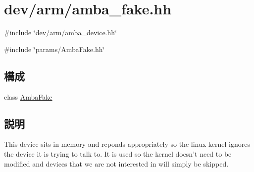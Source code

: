 \hypertarget{amba__fake_8hh}{
\section{dev/arm/amba\_\-fake.hh}
\label{amba__fake_8hh}
}
{\ttfamily \#include \char`\"{}dev/arm/amba\_\-device.hh\char`\"{}}\par
{\ttfamily \#include \char`\"{}params/AmbaFake.hh\char`\"{}}\par
\subsection*{構成}
\begin{DoxyCompactItemize}
\item 
class \hyperlink{classAmbaFake}{AmbaFake}
\end{DoxyCompactItemize}


\subsection{説明}
This device sits in memory and reponds appropriately so the linux kernel ignores the device it is trying to talk to. It is used so the kernel doesn't need to be modified and devices that we are not interested in will simply be skipped. 